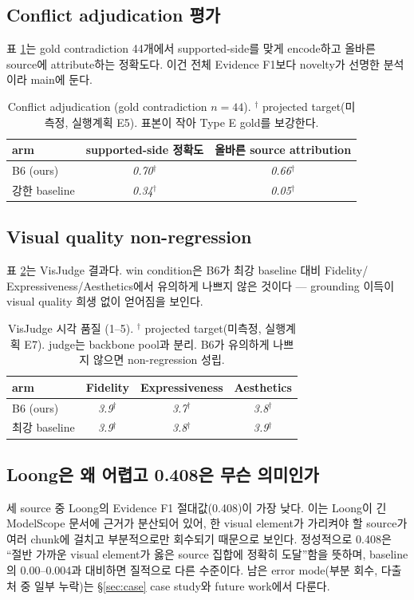 \documentclass[11pt]{article}
\newcommand{\proj}[1]{\textit{#1}$^\dagger$} %
\begin{document}
\subsection{Conflict adjudication 평가}
표 \ref{tab:conflict}는 gold contradiction 44개에서 supported-side를 맞게 encode하고 올바른
source에 attribute하는 정확도다. 이건 전체 Evidence F1보다 novelty가 선명한 분석이라 main에 둔다.

\begin{table}[h]
\centering\small
\begin{tabular}{lcc}
\toprule
arm & supported-side 정확도 & 올바른 source attribution \\
\midrule
B6 (ours) & \proj{0.70} & \proj{0.66} \\
강한 baseline & \proj{0.34} & \proj{0.05} \\
\bottomrule
\end{tabular}
\caption{Conflict adjudication (gold contradiction $n{=}44$). $^\dagger$ projected target(미측정,
실행계획 E5). 표본이 작아 Type E gold를 보강한다.}
\label{tab:conflict}
\end{table}

\subsection{Visual quality non-regression}
표 \ref{tab:visjudge}는 VisJudge 결과다. win condition은 B6가 최강 baseline 대비 Fidelity/
Expressiveness/Aesthetics에서 유의하게 나쁘지 않은 것이다 — grounding 이득이 visual quality
희생 없이 얻어짐을 보인다.

\begin{table}[h]
\centering\small
\begin{tabular}{lccc}
\toprule
arm & Fidelity & Expressiveness & Aesthetics \\
\midrule
B6 (ours) & \proj{3.9} & \proj{3.7} & \proj{3.8} \\
최강 baseline & \proj{3.9} & \proj{3.8} & \proj{3.9} \\
\bottomrule
\end{tabular}
\caption{VisJudge 시각 품질 (1--5). $^\dagger$ projected target(미측정, 실행계획 E7). judge는
backbone pool과 분리. B6가 유의하게 나쁘지 않으면 non-regression 성립.}
\label{tab:visjudge}
\end{table}

\subsection{Loong은 왜 어렵고 0.408은 무슨 의미인가}
세 source 중 Loong의 Evidence F1 절대값(0.408)이 가장 낮다. 이는 Loong이 긴 ModelScope 문서에
근거가 분산되어 있어, 한 visual element가 가리켜야 할 source가 여러 chunk에 걸치고 부분적으로만
회수되기 때문으로 보인다. 정성적으로 0.408은 ``절반 가까운 visual element가 옳은 source 집합에
정확히 도달''함을 뜻하며, baseline의 0.00--0.004과 대비하면 질적으로 다른 수준이다. 남은 error
mode(부분 회수, 다출처 중 일부 누락)는 \S\ref{sec:case} case study와 future work에서 다룬다.
\end{document}
